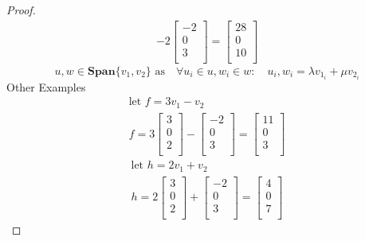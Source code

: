 \documentclass[12pt,a4paper]{article}
\newcommand{\q}{\quad}
\begin{document}
\begin{proof}
\begin{align*}
    -2\begin{bmatrix}
      -2\\
      0\\
      3\\
    \end{bmatrix}
    =\begin{bmatrix}
      28\\
      0\\
      10\\
    \end{bmatrix}
  \end{align*}
  \[
    u,w \in \textbf{Span}\{v_1,v_2\} \text{ as} \q \forall u_i \in u, w_i \in w: \quad u_i,w_i=\lambda v_{1_i}+ \mu v_{2_i}
  \]
  Other Examples
  \begin{align*}
    \text{let } f=3v_1-v_2\\
    f=  3\begin{bmatrix}
        3\\
        0\\
        2\\
    \end{bmatrix}
    -\begin{bmatrix}
      -2\\
      0\\
      3\\
    \end{bmatrix}
    =\begin{bmatrix}
      11\\
      0\\
      3\\
    \end{bmatrix}
  \end{align*}
  \begin{align*}
    \text{let } h=2v_1+v_2\\
    h=  2\begin{bmatrix}
        3\\
        0\\
        2\\
    \end{bmatrix}
    +\begin{bmatrix}
      -2\\
      0\\
      3\\
    \end{bmatrix}
    =\begin{bmatrix}
      4\\
      0\\
      7\\

\end{bmatrix}
\end{align*}
\end{proof}
\end{document}

